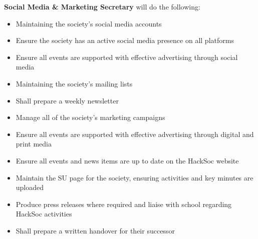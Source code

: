 \begin{subclause}
  \textbf{Social Media \& Marketing Secretary} will do the following:
  \begin{itemize}[label=--,topsep=0em,itemsep=0em]
    \item Maintaining the society's social media accounts
    \item Ensure the society has an active social media presence on all platforms
    \item Ensure all events are supported with effective advertising through social media
    \item Maintaining the society's mailing lists
    \item Shall prepare a weekly newsletter
    \item Manage all of the society's marketing campaigns
    \item Ensure all events are supported with effective advertising through digital and print media
    \item Ensure all events and news items are up to date on the HackSoc website
    \item Maintain the SU page for the society, ensuring activities and key minutes are uploaded
    \item Produce press releases where required and liaise with school regarding HackSoc activities
    \item Shall prepare a written handover for their successor
  \end{itemize}
\end{subclause}
